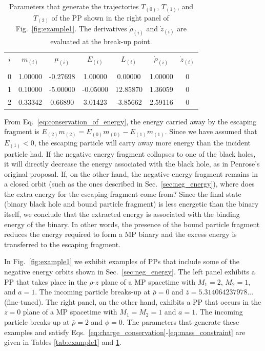 \begin{table}[h]
  \centering
  \begin{tabular}{ccccccc}
    \hline\hline
    $i$ & $m_{(i)}$ & $\mu_{(i)}$ & $E_{(i)}$ & $L_{(i)}$ & $\dot{\rho}_{(i)}$ & $\dot{z}_{(i)}$ \\ \vspace{-0.3cm} \\
    0   & 1.00000   & -0.27698    & 1.00000   & 0.00000   & 1.00000            & 0               \\
    1   & 0.10000   & -5.00000    & -0.05000  & 12.85870  & 1.36059            & 0               \\
    2   & 0.33342   & 0.66890     & 3.01423   & -3.85662  & 2.59116            & 0               \\
    \hline\hline
  \end{tabular}
  \caption{Parameters that generate the trajectories $T_{(0)}$, $T_{(1)}$, and $T_{(2)}$ of the PP shown in the right panel of Fig.~\ref{fig:example1}. The derivatives $\dot{\rho}_{(i)}$ and $\dot{z}_{(i)}$ are evaluated at the break-up point.}
  \label{tab:example2}
\end{table}

From Eq.~\eqref{eq:conservation_of_energy}, the energy carried away by the escaping fragment is $E_{(2)}m_{(2)} = E_{(0)}m_{(0)} - E_{(1)}m_{(1)}$. Since we have assumed that $E_{(1)} < 0$, the escaping particle will carry away more energy than the incident particle had. If the negative energy fragment collapses to one of the black holes, it will directly decrease the energy associated with the black hole, as in Penrose's original proposal. If, on the other hand, the negative energy fragment remains in a closed orbit (such as the ones described in Sec.~\ref{sec:neg_energy}), where does the extra energy for the escaping fragment come from? Since the final state (binary black hole and bound particle fragment) is less energetic than the binary itself, we conclude that the extracted energy is associated with the binding energy of the binary. In other words, the presence of the bound particle fragment reduces the energy required to form a MP binary and the excess energy is transferred to the escaping fragment.


In Fig.~\ref{fig:example1} we exhibit examples of PPs that include some of the negative energy orbits shown in Sec.~\ref{sec:neg_energy}. The left panel exhibits a PP that takes place in the $\rho$-$z$ plane of a MP spacetime with $M_1=2$, $M_2=1$, and $a=1$. The incoming particle breaks-up at $\overline \rho=0$ and $\overline z = 5.314064237978...$ (fine-tuned). The right panel, on the other hand,  exhibits a PP that occurs in the $z=0$ plane of a MP spacetime with $M_1=M_2=1$ and $a=1$. The incoming particle breaks-up at $\overline \rho=2$ and $\phi = 0$. The parameters that generate these examples and satisfy Eqs.~\eqref{eq:charge_conservation}-\eqref{eq:mass_constraint} are given in Tables \ref{tab:example1} and \ref{tab:example2}.



